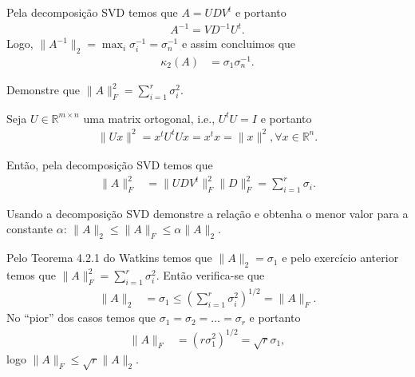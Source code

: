 \begin{questions}
\begin{solution}
        Pela decomposi\c{c}\~{a}o SVD temos que $A = U D V^t$ e portanto
        \begin{align*}
            A^{-1} = V D^{-1} U^t.
        \end{align*}
        Logo, $\| A^{-1} \|_2 = \max_i \sigma_i^{-1} = \sigma_n^{-1}$ e assim concluimos que
        \begin{align*}
            \kappa_2(A) &= \sigma_1 \sigma_n^{-1}.
        \end{align*}
    \end{solution}

     Demonstre que $\| A \|_F^2 = \sum_{i = 1}^r \sigma_i^2$.
    \begin{solution}
        Seja $U \in \mathbb{R}^{m \times n}$ uma matrix ortogonal, i.e., $U^t U = I$ e portanto
        \begin{align*}
            \| U x \|^2 = x^t U^t U x = x^t x = \| x \|^2, \forall x \in \mathbb{R}^n.
        \end{align*}

        Ent\~{a}o, pela decomposi\c{c}\~{a}o SVD temos que
        \begin{align*}
            \| A \|_F^2 &= \| U D V^t \|_F^2 \| D \|_F^2 = \sum_{i = 1}^r \sigma_i.
        \end{align*}
    \end{solution}

    \question Usando a decomposi\c{c}\~{a}o SVD demonstre a rela\c{c}\~{a}o e obtenha o menor valor para a constante $\alpha$: $\| A \|_2 \leq \| A \|_F \leq \alpha \| A \|_2$.
    \begin{solution}
        Pelo Teorema 4.2.1 do Watkins\nocite{Watkins:2004:fundamentals} temos que $\| A \|_2 = \sigma_1$ e pelo exerc\'{i}cio anterior temos que $\| A \|_F^2 = \sum_{i = 1}^r \sigma_i^2$. Ent\~{a}o verifica-se que
        \begin{align*}
            \| A \|_2 &= \sigma_1 \leq \left( \sum_{i = 1}^r \sigma_i^2 \right)^{1/2} = \| A \|_F.
        \end{align*}
        No ``pior'' dos casos temos que $\sigma_1 = \sigma_2 = \ldots = \sigma_r$ e portanto
        \begin{align*}
            \| A \|_F &= \left( r \sigma_1^2 \right)^{1/2} = \sqrt{r} \sigma_1,
        \end{align*}
        logo $\| A \|_F \leq \sqrt{r} \| A \|_2$.
    \end{solution}


\end{questions}
